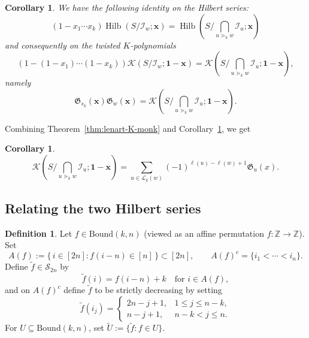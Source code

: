 \documentclass[12pt,reqno]{amsart}
\newtheorem{cor}[lemma]{Corollary}
\theoremstyle{definition}
\newtheorem{definition}[lemma]{Definition}
\newcommand{\symm}{\mathcal{S}}
\newcommand{\hilb}{\operatorname{Hilb}}
\newcommand{\G}{\mathfrak{G}}
\newcommand{\Lenart}{\mathcal{L}}
\begin{document}
{\begin{cor}
\label{cor:monk-hilbert}
    We have the following identity on the Hilbert series:
    \begin{equation}\label{eqn:wmonkhilb}
    (1-x_1\cdots x_k)\hilb(S/\mathcal{I}_w;\mathbf{x})=\hilb(S/\bigcap_{u\gtrdot_k w}\mathcal{I}_u;\mathbf{x})
    \end{equation}
    and consequently on the twisted $K$-polynomials
    \begin{equation}(1-(1-x_1)\cdots (1-x_k))\mathcal{K}(S/\mathcal{I}_w;\mathbf{1-x})=\mathcal{K}(S/\bigcap_{u\gtrdot_k w}\mathcal{I}_u;\mathbf{1-x}),\end{equation}
    namely 
    \begin{equation}
        \mathfrak{G}_{s_k}(\mathbf{x})\mathfrak{G}_{w}(\mathbf{x})=\mathcal{K}(S/\bigcap_{u\gtrdot_k w}\mathcal{I}_u;\mathbf{1-x}).
    \end{equation}
\end{cor}




Combining Theorem~\ref{thm:lenart-K-monk} and Corollary~\ref{cor:monk-hilbert}, we get
\begin{cor}
    \label{cor:grothendieck-agree}
    \begin{equation}
        \mathcal{K}(S/\bigcap_{u\gtrdot_k w}\mathcal{I}_u;\mathbf{1-x})=
        \sum_{u\in \Lenart_k(w)} (-1)^{\ell(u)-\ell(w)+1}\G_u(x).
    \end{equation}
\end{cor}

\subsection{Relating the two Hilbert series}
\label{subsec:relating-hilb}

\begin{definition}\label{def:tilde}
Let \(f\in \mathrm{Bound}(k,n)\) (viewed as an affine permutation \(f:\mathbb Z\to\mathbb Z\)).
Set
\[
A(f):=\{\,i\in [2n]: f(i-n)\in [n]\,\}\subset [2n],
\qquad
A(f)^c=\{i_1<\cdots<i_n\}.
\]
Define \(\widetilde f\in \symm_{2n}\) by
\[
\widetilde f(i)=f(i-n)+k \quad\text{for } i\in A(f),
\]
and on \(A(f)^c\) define \(\widetilde f\) to be strictly decreasing by setting
\[
\widetilde f(i_j)=
\begin{cases}
2n-j+1, & 1\le j\le n-k,\\
n-j+1, & n-k< j\le n.
\end{cases}
\]
For \(U\subseteq \mathrm{Bound}(k,n)\), set \(\widetilde U:=\{\widetilde f: f\in U\}\).
\end{definition}


}
\end{document}
